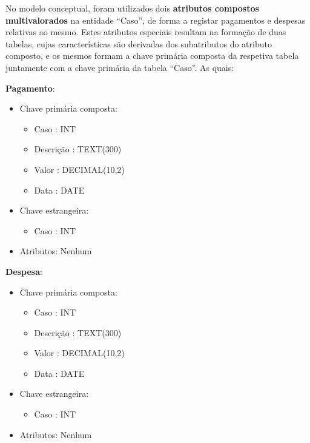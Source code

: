 \documentclass[a4paper,12pt]{scrreprt}
\begin{document}

        No modelo conceptual, foram utilizados dois \textbf{atributos compostos multivalorados} na entidade “Caso”, de forma a registar pagamentos e despesas relativas ao mesmo. Estes atributos especiais resultam na formação de duas tabelas, cujas características são derivadas dos subatributos do atributo composto, e os mesmos formam a chave primária composta da respetiva tabela juntamente com a chave primária da tabela “Caso”. As quais:
        
        \textbf{Pagamento}:
        \begin{itemize}
            \item Chave primária composta:
                \begin{itemize}
                    \item Caso : INT
                    \item Descrição : TEXT(300)
                    \item Valor : DECIMAL(10,2)
                    \item Data : DATE
                \end{itemize}
            \item Chave estrangeira:
                \begin{itemize}
                    \item Caso : INT
                \end{itemize}
            \item Atributos: Nenhum
        \end{itemize}

        \vspace{0.5cm}

        \textbf{Despesa}:
        \begin{itemize}
            \item Chave primária composta:
                \begin{itemize}
                    \item Caso : INT
                    \item Descrição : TEXT(300)
                    \item Valor : DECIMAL(10,2)
                    \item Data : DATE
                \end{itemize}
            \item Chave estrangeira:
                \begin{itemize}
                    \item Caso : INT
                \end{itemize}
            \item Atributos: Nenhum
        \end{itemize}
\end{document}

